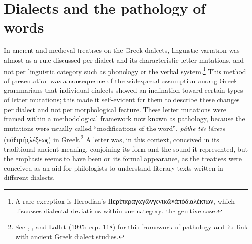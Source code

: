 \section{Dialects and the pathology of words}

In ancient and medieval treatises on the Greek dialects, linguistic variation was almost as a rule discussed per dialect and its characteristic letter mutations, and not per linguistic category such as phonology or the verbal system.\footnote{ \textrm{A rare exception is Herodian’s Περὶπαραγωγῶνγενικῶνἀπὸδιαλέκτων, which discusses dialectal deviations within one category: the genitive case.}} This method of presentation was a consequence of the widespread assumption among Greek grammarians that individual dialects showed an inclination toward certain types of letter mutations; this made it self-evident for them to describe these changes per dialect and not per morphological feature. These letter mutations were framed within a methodological framework now known as pathology, because the mutations were usually called “modifications of the word”, \textit{páthē} \textit{tês} \textit{léxeōs} (πάθητῆςλέξεως) in Greek.\footnote{ \textrm{See \citet{Wackernagel1876}, \citet[150]{Siebenborn1976}, and Lallot (1995: esp. 118) for this framework of pathology and its link with ancient Greek dialect studies.}} A letter was, in this context, conceived in its traditional ancient meaning, conjoining its form and the sound it represented, but the emphasis seems to have been on its formal appearance, as the treatises were conceived as an aid for philologists to understand literary texts written in different dialects.



